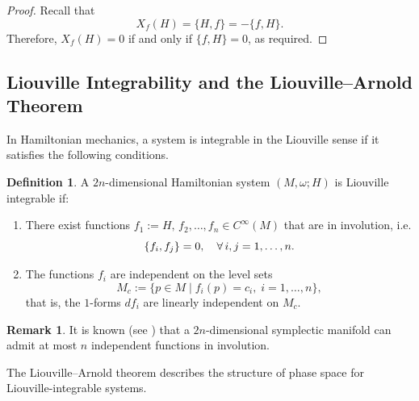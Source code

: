 \documentclass[12pt,oneside]{report}
\theoremstyle{definition}
\newtheorem{definition}{Definition}
\newtheorem{remark}{Remark}
\begin{document}
\begin{proof}
Recall that 
\[
X_f(H) = \{ H, f \} = -\{ f, H \}.
\]
Therefore, \( X_f(H) = 0 \) if and only if \( \{ f, H \} = 0 \), as required.
\end{proof}




\subsection{Liouville Integrability and the Liouville–Arnold Theorem}

In Hamiltonian mechanics, a system is integrable in the Liouville sense if it satisfies the following conditions.

\begin{definition}\label{liouville}
A $2n$-dimensional Hamiltonian system $(M,\omega;H)$ is Liouville integrable if:
\begin{enumerate}
    \item There exist functions $
    f_1:= H, \, f_2, \dots, f_n \in C^\infty(M)$ that are in {involution}, i.e.
    $$
    \displaystyle \left\{ f_{i} , f_{j} \right\} = 0,\quad \forall\, i,j=1,\dots,n.
    $$
    \item The functions $f_i$ are independent on the level sets
    $$
    M_c := \{ p \in M \mid f_i(p)=c_i,\; i=1,\dots,n \},
    $$
    that is, the $1$-forms $df_i$ are linearly independent on $M_c$.
\end{enumerate}
\end{definition}

\begin{remark}
 It is known (see \cite{arnol2013mathematical}) that a  $2n$-dimensional symplectic manifold can admit at most $n$ independent functions in involution.
\end{remark}

The Liouville–Arnold theorem describes the structure of phase space for Liouville-integrable systems.
\end{document}

